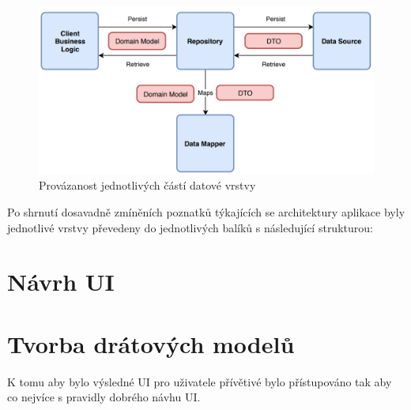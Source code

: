 \begin{figure}[H]
  \centering
  \includegraphics[width=.8\textwidth]{arch_diagram.png}
  \caption{Provázanost jednotlivých částí datové vrstvy}
  \label{fig:arch_diagram}
\end{figure}

\bigskip

Po shrnutí dosavadně zmíněních poznatků týkajících se architektury aplikace byly jednotlivé vrstvy převedeny do jednotlivých balíků s následující
strukturou:

\bigskip






\section{Návrh UI}

\section{Tvorba drátových modelů}
K tomu aby bylo výsledné UI pro uživatele přívětivé bylo přístupováno tak aby co nejvíce  s pravidly dobrého návhu UI.

